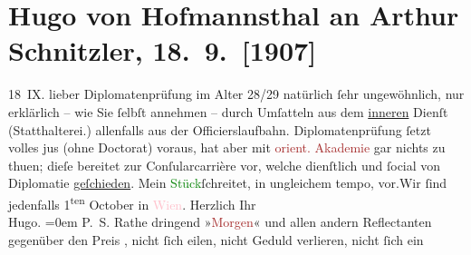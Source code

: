 

               \section[Hugo von Hofmannsthal an Arthur Schnitzler, 18. 9. {[}1907{]}]{ Hugo von Hofmannsthal an Arthur Schnitzler, 18. 9. {[}1907{]}}\nopagebreak{}\rehead{ }\normalsize\beginnumbering{} \toendnotes[C]{\smallbreak\pagebreak[2]} 
\toendnotes[C]{\smallbreak}\pstart
           \raggedleft{}18 IX.\pend
           \pstart{}{\pb}lieber\pend\pstart
           Diplomatenprüfung im Alter 28/29 natürlich ſehr ungewöhnlich, nur erklärlich – wie
               Sie ſelbſt annehmen – durch Umſatteln aus dem \uline{inneren}
               Dienſt (Statthalterei.) allenfalls aus der Officierslaufbahn. Diplomatenprüfung ſetzt
               volles jus (ohne Doctorat) voraus, hat aber mit \textcolor{brown}{orient.
                  Akademie}{}\ledrightnote{\textcolor{brown}{Orientalische Akademie}} gar nichts zu thuen; dieſe bereitet zur Conſularcarrière {\pb}vor, welche dienſtlich und ſocial
               von Diplomatie \uline{geſchieden}.\pend
           \pstart
           Mein \textcolor{green}{Stück}{}\ledrightnote{\textcolor{green}{Silvia im »Stern«}}{ }ſchreitet, in ungleichem tempo, vor.\hspace*{1.5em}Wir ſind jedenfalls 1\textsuperscript{ten} October in \textcolor{pink}{Wien}{}\ledrightnote{\textcolor{pink}{Wien}}.\pend
           \pstart
           Herzlich Ihr{\\[\baselineskip]}\spacefill\mbox{Hugo.}\pend
           \leftskip=0em{}\pstart
           \textsc{P. S.} Rathe dringend »\textcolor{brown}{Morgen}{}\ledrightnote{\textcolor{brown}{Morgen. Wochenschrift für deutsche Kultur}}« und allen andern Reflectanten gegenüber den Preis , nicht ſich eilen, nicht {\pb}Geduld verlieren, nicht ſich ein
